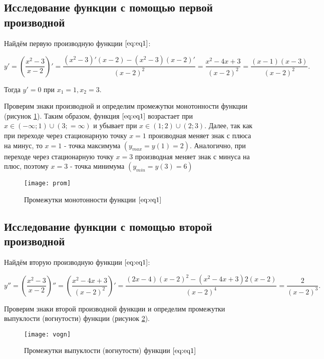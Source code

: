 \subsection{Исследование функции с помощью первой производной}

Найдём первую производную функции $\eqref{eq:eq1}$:

\[y' = \left(\frac{x^2-3}{x-2}\right)' = \frac{(x^2-3)'(x-2)-(x^2-3)(x-2)'}{(x-2)^2}  = \frac{x^2-4x+3}{(x-2)^2} = \frac{(x-1)(x-3)}{(x-2)^2}.\]

Тогда $y' = 0$ при $x_1 = 1, x_2 = 3$.

Проверим знаки производной и определим промежутки монотонности функции (рисунок \ref{pic:prom}). Таким образом, функция $\eqref{eq:eq1}$ возрастает при $x \in (-\infty;1) \cup (3; =\infty)$ и убывает при $x \in (1;2) \cup (2;3)$. Далее, так как при переходе через стационарную точку $x = 1$ производная меняет знак с плюса на минус, то $x=1$ - точка максимума $(y_{max} = y(1) = 2)$. Аналогично, при переходе через стационарную точку
$x = 3$ производная меняет знак с минуса на плюс, поэтому $x = 3$ - точка минимума $(y_{min} = y(3) = 6)$

\begin{figure}[H]
	\begin{center}
		\texttt{[image: prom]}
		\caption{Промежутки монотонности функции $\eqref{eq:eq1}$}
		\label{pic:prom}
	\end{center}
\end{figure}

\subsection{Исследование функции с помощью второй производной}

Найдём вторую производную функции $\eqref{eq:eq1}$:

\[y'' = \left(\frac{x^2-3}{x-2}\right)'' = \left(\frac{x^2-4x+3}{(x-2)^2}\right)' = \frac{(2x-4)(x-2)^2 - (x^2-4x+3)2(x-2)}{(x-2)^4} = \frac{2}{(x-2)^3}.\]

Проверим знаки второй производной функции и определим промежутки выпуклости (вогнутости) функции (рисунок \ref{pic:vogn}).

\begin{figure}[H]
	\begin{center}
		\texttt{[image: vogn]}
		\caption{Промежутки выпуклости (вогнутости) функции $\eqref{eq:eq1}$}
		\label{pic:vogn}
	\end{center}
\end{figure}

